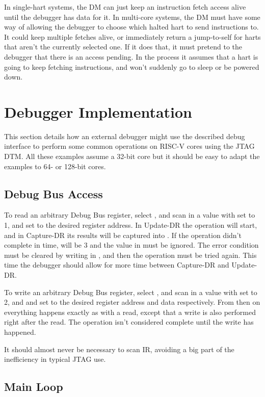 \documentclass{article}
\begin{document}
In single-hart systems, the DM can just keep an instruction fetch access alive
until the debugger has data for it.  In multi-core systems, the DM must have
some way of allowing the debugger to choose which halted hart to send
instructions to. It could keep multiple fetches alive, or immediately return a
jump-to-self for harts that aren't the currently selected one. If it does that,
it must pretend to the debugger that there is an access pending. In the process
it assumes that a hart is going to keep fetching instructions, and won't
suddenly go to sleep or be powered down.

\section{Debugger Implementation}

This section details how an external debugger might use the described debug
interface to perform some common operations on RISC-V cores using the JTAG DTM.
All these examples assume a 32-bit core but it should be easy to adapt the
examples to 64- or 128-bit cores.

\subsection{Debug Bus Access} \label{dbusaccess}

To read an arbitrary Debug Bus register, select \Rdbus, and scan in a value
with \Fop set to 1, and \Faddress set to the desired register address. In
Update-DR the operation will start, and in Capture-DR its results will be
captured into \Fdata.  If the operation didn't complete in time, \Fop will be 3
and the value in \Fdata must be ignored. The error condition must be cleared by
writing \Fdbusreset in \Rdtmcontrol, and then the operation must be tried
again. This time the debugger should allow for more time between Capture-DR and
Update-DR.

To write an arbitrary Debug Bus register, select \Rdbus, and scan in a value
with \Fop set to 2, and \Faddress and \Fdata set to the desired register
address and data respectively. From then on everything happens exactly as with
a read, except that a write is also performed right after the read. The
operation isn't considered complete until the write has happened.

It should almost never be necessary to scan IR, avoiding a big part of the
inefficiency in typical JTAG use.

\subsection{Main Loop}
\end{document}

